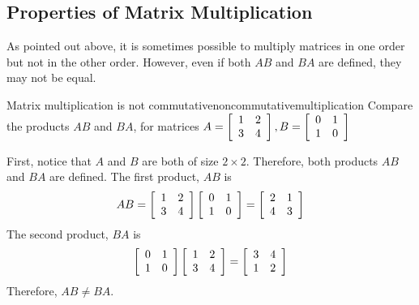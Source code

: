 \subsection{Properties of Matrix Multiplication}

As pointed out above, it is sometimes possible
to multiply matrices in one order
but not in the other order. However, even if both $AB$ and $BA$ are defined,
they may not be equal. 

\begin{example}{Matrix multiplication is not commutative}{noncommutativemultiplication}
Compare the products $AB$ and $BA$, for matrices $ A = \left[
\begin{array}{rr}
1 & 2 \\
3 & 4
\end{array}
\right], B= \left[
\begin{array}{rr}
0 & 1 \\
1 & 0
\end{array}
\right] $ 
\end{example}

\begin{solution} 
First, notice that $A$ and $B$ are both of size $2 \times 2$. Therefore, both 
products $AB$ and $BA$ are defined. 
The first product, $AB$ is
\begin{equation*}
AB = \left[
\begin{array}{rr}
1 & 2 \\
3 & 4
\end{array}
\right] \left[
\begin{array}{rr}
0 & 1 \\
1 & 0
\end{array}
\right] = \left[
\begin{array}{rr}
2 & 1 \\
4 & 3
\end{array}
\right] 
\end{equation*}
The second product, $BA$ is
\begin{equation*}
\left[
\begin{array}{rr}
0 & 1 \\
1 & 0
\end{array}
\right] \left[
\begin{array}{rr}
1 & 2 \\
3 & 4
\end{array}
\right] = \left[
\begin{array}{rr}
3 & 4 \\
1 & 2
\end{array}
\right] 
\end{equation*}
Therefore, $AB \neq BA$. 
\end{solution}

